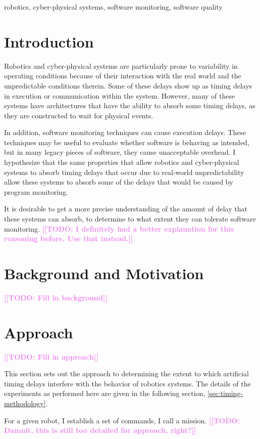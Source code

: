 \documentclass[conference]{IEEEtran}
\newcommand{\todo}[1]{\textcolor{violet}{{\bfseries [[TODO: #1]]}}}
\begin{document}
\begin{IEEEkeywords}
robotics, cyber-physical systems, software monitoring, software quality
\end{IEEEkeywords}

\section{Introduction}
Robotics and cyber-physical systems are particularly prone to variability in operating conditions because of their interaction with the real world and the unpredictable conditions therein. Some of these delays show up as timing delays in execution or communication within the system. However, many of these systems have architectures that have the ability to absorb some timing delays, as they are constructed to wait for physical events.

In addition, software monitoring techniques can cause execution delays. These techniques may be useful to evaluate whether software is behaving as intended, but in many legacy pieces of software, they cause unacceptable overhead. I hypothesize that the same properties that allow robotics and cyber-physical systems to absorb timing delays that occur due to real-world unpredictability allow these systems to absorb some of the delays that would be caused by program monitoring.

It is desirable to get a more precise understanding of the amount of delay that these systems can absorb, to determine to what extent they can tolerate software monitoring. 
\todo{I definitely had a better explanation for this reasoning before. Use that instead.}


\section{Background and Motivation}
\label{sec:background}
\todo{Fill in background}

\section{Approach}
\label{sec:approach}
\todo{Fill in approach}

This section sets out the approach to determining the extent to which artificial timing delays interfere with the behavior of robotics systems.
The details of the experiments as performed here are given in the following
section, \ref{sec:timing-methodology}.

For a given robot, I establish a set of commands, I call a mission. \todo{Damnit, this is still too detailed for approach, right?}
\end{document}

